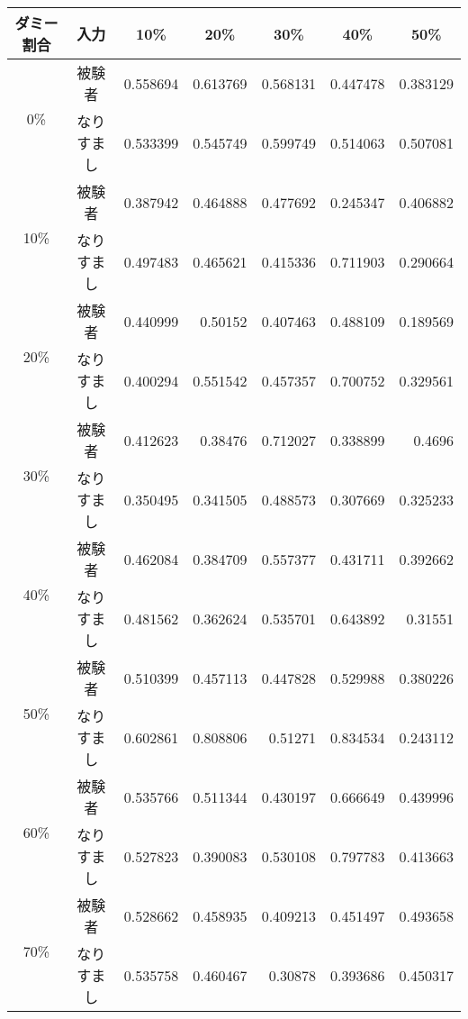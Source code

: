 \begin{center}
  \begin{longtable}[btph]{|c|c|r|r|r|r|r|}
    \hline
      \multicolumn{1}{|c|}{ダミー割合} & \multicolumn{1}{c|}{入力} & \multicolumn{1}{c|}{10\%} & \multicolumn{1}{c|}{20\%} & \multicolumn{1}{c|}{30\%} & \multicolumn{1}{c|}{40\%} & \multicolumn{1}{c|}{50\%} \\ \hline
      \multirow{2}{*}{0\%}  & 被験者 & 0.558694 & 0.613769 & 0.568131 & 0.447478 & 0.383129 \\ \cline{2-7}
           & なりすまし & 0.533399 & 0.545749 & 0.599749 & 0.514063 & 0.507081 \\ \hline
      \multirow{2}{*}{10\%} & 被験者 & 0.387942 & 0.464888 & 0.477692 & 0.245347 & 0.406882 \\ \cline{2-7}
           & なりすまし & 0.497483 & 0.465621 & 0.415336 & 0.711903 & 0.290664 \\ \hline
      \multirow{2}{*}{20\%} & 被験者 & 0.440999 & 0.50152 & 0.407463 & 0.488109 & 0.189569 \\ \cline{2-7}
           & なりすまし & 0.400294 & 0.551542 & 0.457357 & 0.700752 & 0.329561 \\ \hline
      \multirow{2}{*}{30\%} & 被験者 & 0.412623 & 0.38476 & 0.712027 & 0.338899 & 0.4696 \\ \cline{2-7}
           & なりすまし & 0.350495 & 0.341505 & 0.488573 & 0.307669 & 0.325233 \\ \hline
      \multirow{2}{*}{40\%} & 被験者 & 0.462084 & 0.384709 & 0.557377 & 0.431711 & 0.392662 \\ \cline{2-7}
           & なりすまし & 0.481562 & 0.362624 & 0.535701 & 0.643892 & 0.31551 \\ \hline
      \multirow{2}{*}{50\%} & 被験者 & 0.510399 & 0.457113 & 0.447828 & 0.529988 & 0.380226 \\ \cline{2-7}
           & なりすまし & 0.602861 & 0.808806 & 0.51271 & 0.834534 & 0.243112 \\ \hline
      \multirow{2}{*}{60\%} & 被験者 & 0.535766 & 0.511344 & 0.430197 & 0.666649 & 0.439996 \\ \cline{2-7}
           & なりすまし & 0.527823 & 0.390083 & 0.530108 & 0.797783 & 0.413663 \\ \hline
      \multirow{2}{*}{70\%} & 被験者 & 0.528662 & 0.458935 & 0.409213 & 0.451497 & 0.493658 \\ \cline{2-7}
           & なりすまし & 0.535758 & 0.460467 & 0.30878 & 0.393686 & 0.450317 \\ \hline

\end{longtable}
\end{center}
